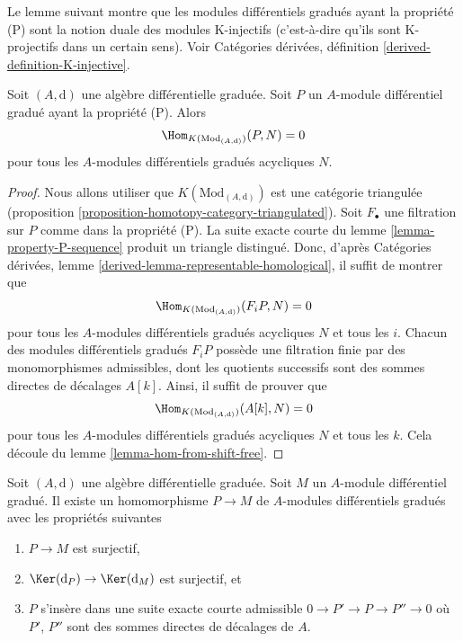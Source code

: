 \noindent
Le lemme suivant montre que les modules différentiels gradués ayant la
propriété (P) sont la notion duale des modules K-injectifs
(c'est-à-dire qu'ils sont K-projectifs dans un certain
sens). Voir Catégories dérivées, définition \ref{derived-definition-K-injective}.

\begin{lemma}
\label{lemma-property-P-K-projective}
Soit $(A, \text{d})$ une algèbre différentielle graduée.
Soit $P$ un $A$-module différentiel gradué ayant la propriété (P).
Alors
$$
\Hom_{K(\text{Mod}_{(A, \text{d})})}(P, N) = 0
$$
pour tous les $A$-modules différentiels gradués acycliques $N$.
\end{lemma}

\begin{proof}
Nous allons utiliser que $K(\text{Mod}_{(A, \text{d})})$ est une
catégorie triangulée (proposition
\ref{proposition-homotopy-category-triangulated}). Soit $F_\bullet$ une filtration sur $P$ comme dans la
propriété (P). La suite exacte courte du lemme
\ref{lemma-property-P-sequence} produit un triangle distingué. Donc, d'après
Catégories dérivées, lemme \ref{derived-lemma-representable-homological}, il
suffit de montrer que
$$
\Hom_{K(\text{Mod}_{(A, \text{d})})}(F_iP, N) = 0
$$
pour tous les $A$-modules différentiels gradués acycliques $N$ et tous les
$i$. Chacun des modules différentiels gradués $F_iP$ possède une filtration finie par des
monomorphismes admissibles, dont les quotients successifs sont des sommes
directes de décalages $A[k]$. Ainsi, il suffit de prouver que
$$
\Hom_{K(\text{Mod}_{(A, \text{d})})}(A[k], N) = 0
$$
pour tous les $A$-modules différentiels gradués acycliques $N$ et tous
les $k$. Cela découle du lemme \ref{lemma-hom-from-shift-free}.
\end{proof}

\begin{lemma}
\label{lemma-good-quotient}
Soit $(A, \text{d})$ une algèbre différentielle
graduée. Soit $M$ un $A$-module différentiel gradué. Il existe un homomorphisme
$P \to M$ de $A$-modules différentiels gradués avec les propriétés
suivantes
\begin{enumerate}
\item $P \to M$ est surjectif,
\item $\Ker(\text{d}_P) \to \Ker(\text{d}_M)$ est surjectif, et
\item $P$ s'insère dans une suite exacte courte admissible
$0 \to P' \to P \to P'' \to 0$ où $P'$, $P''$ sont des sommes directes
de décalages de $A$.
\end{enumerate}
\end{lemma}

